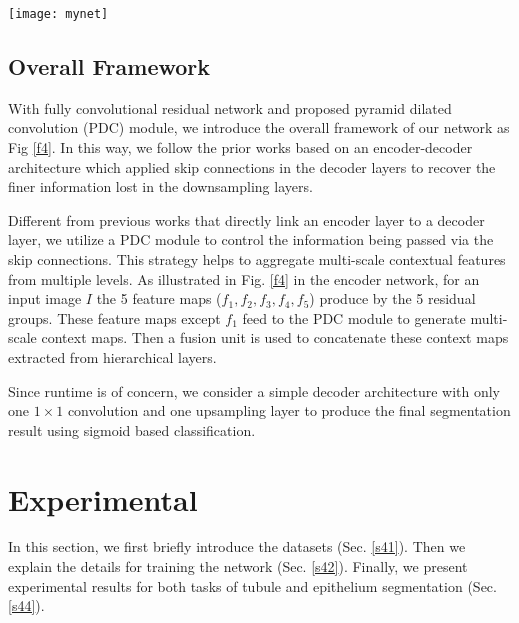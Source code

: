 \documentclass[10pt,twocolumn]{article}
\begin{document}
\begin{figure*}[h]
\centering
\texttt{[image: mynet]}
\caption{Overview of our network framework. A fully convolutional residual network with one $7\times7$ convolution layer and five residual groups is used to compute low and high-level features from the input image. The extracted feature maps ($f_{2},f_{3}, f_{4}, f_{5}$) are then fed to the PDC module to generate multi-level and multi-scale contextual information. Finally, after a concatenation unit, we applied $1\times1$ convolution with a standard 16x bilinear upsampling to build an end-to-end network for pixel-wise dense prediction.
}



\label{f4}
\end{figure*}
\subsection{Overall Framework} \label{s33}
With fully convolutional residual network and proposed pyramid dilated convolution (PDC) module, we introduce the overall framework of our network as Fig \ref{f4}. 
In this way, we follow the prior works based on an encoder-decoder architecture \cite{r3,r7,r8} which applied skip connections in the decoder layers to recover the finer information lost in the downsampling layers.

Different from previous works that directly link an encoder layer to a decoder layer, we utilize a PDC module to control the information being passed via the skip connections.
This strategy helps to aggregate multi-scale contextual features from multiple levels. As illustrated in Fig. \ref{f4} in the encoder network, for an input image $I$ the 5 feature maps ($f_{1}, f_{2}, f_{3}, f_{4}, f_{5}$) produce by the 5 residual groups. These feature maps except $f_{1}$ feed to the PDC module to generate multi-scale context maps.
Then a fusion unit is used to concatenate these context maps extracted from hierarchical layers.

Since runtime is of concern, we consider a simple decoder architecture with only one $1\times1$ convolution and one upsampling layer to produce the final segmentation result using sigmoid based classification.

\section{Experimental}\label{s4}
In this section, we first briefly introduce the datasets (Sec. \ref{s41}). Then we explain the details for training the network (Sec. \ref{s42}). Finally, we present experimental results for both tasks of tubule and epithelium segmentation (Sec. \ref{s44}).
\end{document}
